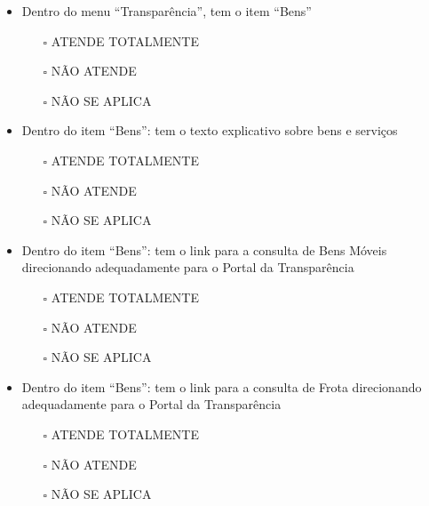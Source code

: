\documentclass[
]{book}
\providecommand{\tightlist}{%
  \setlength{\itemsep}{0pt}\setlength{\parskip}{0pt}}
\begin{document}
\begin{itemize}
\tightlist
\item
  Dentro do menu ``Transparência'', tem o item ``Bens''

  \begin{itemize}
  \tightlist
  \item[$\square$]
    ATENDE TOTALMENTE
  \item[$\square$]
    NÃO ATENDE
  \item[$\square$]
    NÃO SE APLICA
  \end{itemize}
\item
  Dentro do item ``Bens'': tem o texto explicativo sobre bens e serviços

  \begin{itemize}
  \tightlist
  \item[$\square$]
    ATENDE TOTALMENTE
  \item[$\square$]
    NÃO ATENDE
  \item[$\square$]
    NÃO SE APLICA
  \end{itemize}
\item
  Dentro do item ``Bens'': tem o link para a consulta de Bens Móveis direcionando adequadamente para o Portal da Transparência

  \begin{itemize}
  \tightlist
  \item[$\square$]
    ATENDE TOTALMENTE
  \item[$\square$]
    NÃO ATENDE
  \item[$\square$]
    NÃO SE APLICA
  \end{itemize}
\item
  Dentro do item ``Bens'': tem o link para a consulta de Frota direcionando adequadamente para o Portal da Transparência

  \begin{itemize}
  \tightlist
  \item[$\square$]
    ATENDE TOTALMENTE
  \item[$\square$]
    NÃO ATENDE
  \item[$\square$]
    NÃO SE APLICA
  \end{itemize}
\end{itemize}
\end{document}

